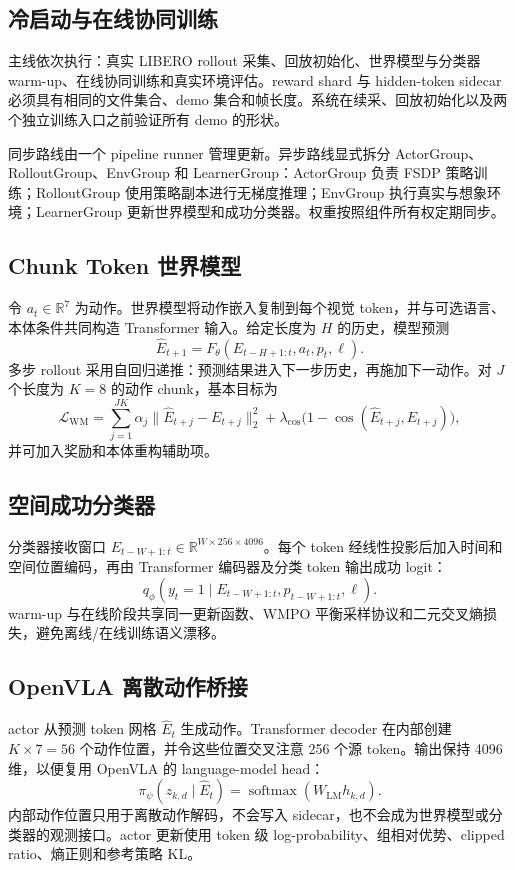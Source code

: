 \documentclass{article}
\begin{document}
\subsection{冷启动与在线协同训练}

主线依次执行：真实 LIBERO rollout 采集、回放初始化、世界模型与分类器 warm-up、在线协同训练和真实环境评估。reward shard 与 hidden-token sidecar 必须具有相同的文件集合、demo 集合和帧长度。系统在续采、回放初始化以及两个独立训练入口之前验证所有 demo 的形状。

同步路线由一个 pipeline runner 管理更新。异步路线显式拆分 ActorGroup、RolloutGroup、EnvGroup 和 LearnerGroup：ActorGroup 负责 FSDP 策略训练；RolloutGroup 使用策略副本进行无梯度推理；EnvGroup 执行真实与想象环境；LearnerGroup 更新世界模型和成功分类器。权重按照组件所有权定期同步。

\subsection{Chunk Token 世界模型}

令 $a_t\in\mathbb{R}^{7}$ 为动作。世界模型将动作嵌入复制到每个视觉 token，并与可选语言、本体条件共同构造 Transformer 输入。给定长度为 $H$ 的历史，模型预测
\[
\widehat{E}_{t+1}
 =F_\theta(E_{t-H+1:t},a_t,p_t,\ell).
\]
多步 rollout 采用自回归递推：预测结果进入下一步历史，再施加下一动作。对 $J$ 个长度为 $K=8$ 的动作 chunk，基本目标为
\[
\mathcal{L}_{\mathrm{WM}}
=\sum_{j=1}^{JK}\alpha_j
  \|\widehat{E}_{t+j}-E_{t+j}\|_2^2
+\lambda_{\cos}\bigl(1-\cos(\widehat{E}_{t+j},E_{t+j})\bigr),
\]
并可加入奖励和本体重构辅助项。

\subsection{空间成功分类器}

分类器接收窗口
$E_{t-W+1:t}\in\mathbb{R}^{W\times256\times4096}$。每个 token 经线性投影后加入时间和空间位置编码，再由 Transformer 编码器及分类 token 输出成功 logit：
\[
q_\phi(y_t=1\mid E_{t-W+1:t},p_{t-W+1:t},\ell).
\]
warm-up 与在线阶段共享同一更新函数、WMPO 平衡采样协议和二元交叉熵损失，避免离线/在线训练语义漂移。

\subsection{OpenVLA 离散动作桥接}

actor 从预测 token 网格 $\widehat{E}_t$ 生成动作。Transformer decoder 在内部创建 $K\times7=56$ 个动作位置，并令这些位置交叉注意 256 个源 token。输出保持 4096 维，以便复用 OpenVLA 的 language-model head：
\[
\pi_\psi(z_{k,d}\mid\widehat{E}_t)
=\operatorname{softmax}(W_{\mathrm{LM}}h_{k,d}).
\]
内部动作位置只用于离散动作解码，不会写入 sidecar，也不会成为世界模型或分类器的观测接口。actor 更新使用 token 级 log-probability、组相对优势、clipped ratio、熵正则和参考策略 KL。
\end{document}
